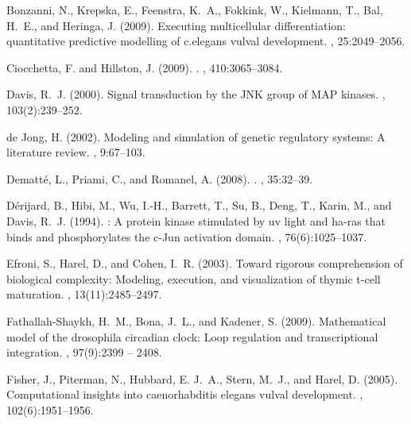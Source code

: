 \documentclass{bmcart}
\begin{document}
\begin{backmatter}
\begin{thebibliography}{}
Bonzanni, N., Krepska, E., Feenstra, K.~A., Fokkink, W., Kielmann, T., Bal,
  H.~E., and Heringa, J. (2009).
\newblock Executing multicellular differentiation: quantitative predictive
  modelling of c.elegans vulval development.
,
  25:2049--2056.

Ciocchetta, F. and Hillston, J. (2009).
.
, 410:3065--3084.

Davis, R.~J. (2000).
\newblock Signal transduction by the {JNK} group of {MAP} kinases.
, 103(2):239--252.

{de Jong}, H. (2002).
\newblock Modeling and simulation of genetic regulatory systems: A literature
  review.
, 9:67--103.

Dematt\'{e}, L., Priami, C., and Romanel, A. (2008).
.
, 35:32--39.

D{\'{e}}rijard, B., Hibi, M., Wu, I.-H., Barrett, T., Su, B., Deng, T., Karin,
  M., and Davis, R.~J. (1994).
: A protein kinase stimulated by uv light and ha-ras that binds
  and phosphorylates the c-{Jun} activation domain.
, 76(6):1025--1037.

Efroni, S., Harel, D., and Cohen, I.~R. (2003).
\newblock Toward rigorous comprehension of biological complexity: Modeling,
  execution, and visualization of thymic t-cell maturation.
, 13(11):2485--2497.

Fathallah-Shaykh, H.~M., Bona, J.~L., and Kadener, S. (2009).
\newblock Mathematical model of the drosophila circadian clock: Loop regulation
  and transcriptional integration.
, 97(9):2399 -- 2408.

Fisher, J., Piterman, N., Hubbard, E. J.~A., Stern, M.~J., and Harel, D.
  (2005).
\newblock Computational insights into caenorhabditis elegans vulval
  development.
, 102(6):1951--1956.


\end{thebibliography}
\end{backmatter}
\end{document}
